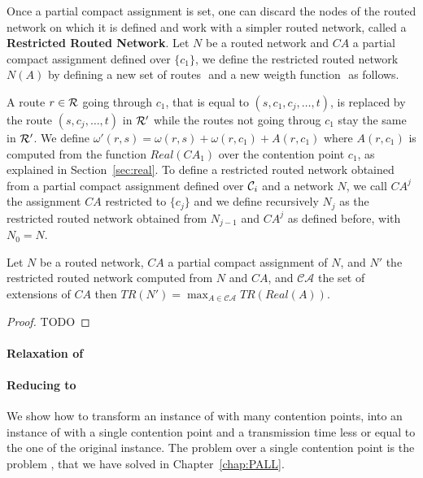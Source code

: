 Once a partial compact assignment is set, one can discard the nodes of the routed network on which it is defined
and work with a simpler routed network, called a \textbf{Restricted Routed Network}. Let $N$ be a routed network
and $CA$ a partial compact assignment defined over $\{c_1\}$, we define the restricted routed network $N(A)$ by defining a new set of routes $ $ and a new weigth function $ $ as follows. 

A route $r \in {\cal R}$ going through $c_1$, that is equal to $(s,c_1,c_j,\ldots,t)$,  is replaced by the route $(s,c_j,\ldots,t)$ in ${\cal R}'$ while the routes not going throug $c_1$ stay the same in ${\cal R}'$. We define $\omega'(r,s) = \omega(r,s)+\omega(r,c_1) + A(r,c_1)$ where $A(r,c_1)$ is computed from the function $Real(CA_1)$ over the contention point $c_1$, as explained in Section~\ref{sec:real}. To define a restricted routed network obtained from a partial compact assignment defined over ${\cal C}_i$ and a network $N$,  we call $CA^j$ the assignment $CA$ restricted to $\{c_j\}$ and 
we define recursively $N_j$ as the restricted routed network obtained from $N_{j-1}$ and $CA^{j}$ as defined before, with $N_0 = N$.



\begin{lemma}
Let $N$ be a routed network, $CA$ a partial compact assignment of $N$,
and $N'$ the restricted routed network computed from $N$ and $CA$, and $\mathcal{CA}$
the set of extensions of $CA$ then $TR(N') = \max_{ A \in \mathcal{CA}} TR(Real(A))$.
\end{lemma}
\begin{proof}
TODO
\end{proof}

\paragraph{Relaxation of \spall}



\paragraph{Reducing \spall to \wta}

We show how to transform an instance of \spall with many contention points, into an instance
of \spall with a single contention point and a transmission time less or equal to the one of the original instance.
The problem \spall over a single contention point is the problem \wta, that we have solved in Chapter~\ref{chap:PALL}.

